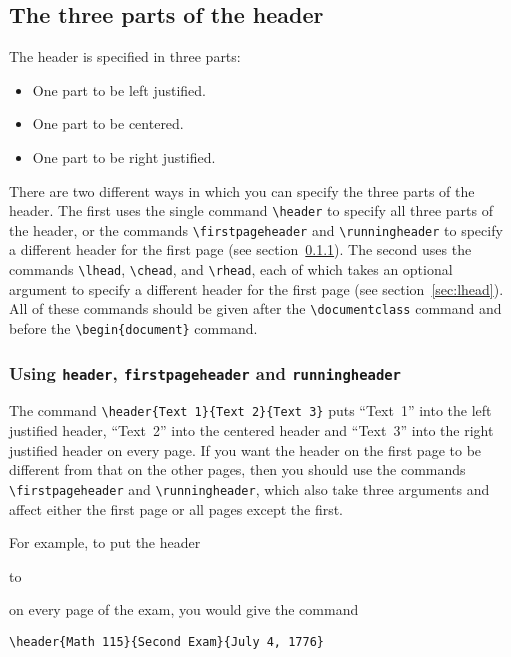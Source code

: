 \documentclass[12pt]{exam}
\def\samplehead#1#2#3#4{%
  \begin{trivlist}
     \item[]
     \leavevmode
     \hbox to \textwidth{%
         \rlap{\parbox[b]{\textwidth}{\raggedright#1\strut}}%
         \hfil\parbox[b]{\textwidth}{\centering#2\strut}\hfil
         \llap{\parbox[b]{\textwidth}{\raggedleft#3\strut}}%
  }%
  #4
  \end{trivlist}
}
\begin{document}
\subsection{The three parts of the header} 
\label{sec:header}
The header is specified in three parts:
%
\begin{itemize}
\item
One part to be left justified.

\item
One part to be centered.

\item
One part to be right justified.
\end{itemize}
%
There are two different ways in which you can specify the three parts
of the header.  The first uses the single command \verb"\header" to
specify all three parts of the header, or the commands
\verb"\firstpageheader" and \verb"\runningheader" to specify a
different header for the first page (see
section~\ref{sec:runningheader}). The second uses the commands
\verb"\lhead", \verb"\chead", and \verb"\rhead", each of which takes
an optional argument to specify a different header for the first page
(see section~\ref{sec:lhead}).  All of these commands should be given
after the \verb"\documentclass" command and before the
\verb"\begin{document}" command.



\subsubsection{Using \texttt{header}, \texttt{firstpageheader} and
    \texttt{runningheader}}
\label{sec:runningheader}


The command \verb"\header{Text 1}{Text 2}{Text 3}" puts ``Text~1''
into the left justified header, ``Text~2'' into the centered header
and ``Text~3'' into the right justified header on every page.  If you
want the header on the first page to be different from that on the
other pages, then you should use the commands \verb"\firstpageheader"
and \verb"\runningheader", which also take three arguments and affect
either the first page or all pages except the first.


For example, to put the header
\samplehead{Math 115}{Second Exam}{July 4, 1776}{}
on every page of the exam, you would give the command
%
\begin{verbatim}
\header{Math 115}{Second Exam}{July 4, 1776}
\end{verbatim}
\end{document}
